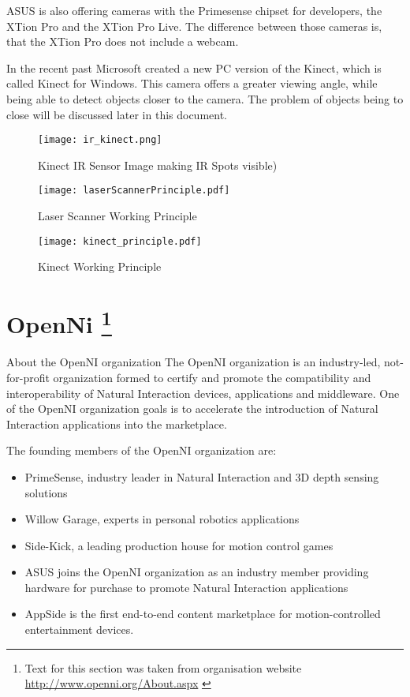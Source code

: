 ASUS is also offering cameras with the Primesense chipset for developers, the XTion Pro and the XTion Pro Live.
The difference between those cameras is, that the XTion Pro does not include a webcam.

In the recent past Microsoft created a new PC version of the Kinect, which is called Kinect for Windows.
This camera offers a greater viewing angle, while being able to detect objects closer to the camera.
The problem of objects being to close will be discussed later in this document.

\begin{figure}[htp]
	\centering
	\texttt{[image: ir\_kinect.png]}
	\caption{Kinect IR Sensor Image making IR Spots visible)}
	\label{figure:kinect_ir}
\end{figure}

\begin{figure}[htp]
	\centering
	\texttt{[image: laserScannerPrinciple.pdf]}
	\caption{Laser Scanner Working Principle}
	\label{figure:ls_WP}
\end{figure}


\begin{figure}[htp]
	\centering
	\texttt{[image: kinect\_principle.pdf]}
	\caption{Kinect Working Principle}
	\label{figure:kinect_WP} 
\end{figure}
\clearpage

\section[OpenNi]{OpenNi \footnote{Text for this section was taken from organisation website \url{http://www.openni.org/About.aspx} \cite{openni:about}}}

About the OpenNI organization
The OpenNI organization is an industry-led, not-for-profit organization formed to certify and 
promote the compatibility and interoperability of Natural Interaction devices, applications and middleware. 
One of the OpenNI organization goals is to accelerate the introduction of Natural Interaction applications into 
the marketplace.

The founding members of the OpenNI organization are:
\begin{itemize}
  \item PrimeSense, industry leader in Natural Interaction and 3D depth sensing solutions   
  \item Willow Garage, experts in personal robotics applications  
  \item Side-Kick, a leading production house for motion control games  
  \item ASUS joins the OpenNI organization as an industry member providing hardware for purchase to promote Natural Interaction applications
  \item AppSide is the first end-to-end content marketplace for motion-controlled entertainment devices. 
\end{itemize}

